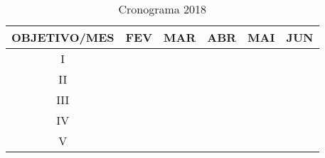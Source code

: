 \documentclass[
	12pt,				%
	openright,			%
	oneside,			%
	a4paper,			%
	english,			%
	french,				%
	spanish,			%
	brazil,				%
	]{abntex2}
\begin{document}
	\begin{table}[h!]
	\centering
	\caption{Cronograma 2018}
	\label{my-label}
	\begin{tabular}{|c|c|c|c|c|c|}
		\hline
		OBJETIVO/MES & FEV & MAR & ABR & MAI & JUN \\ \hline
		I &  & & & & \\ \hline
		II &  & & & & \\ \hline
		III &  & & & & \\ \hline
		IV &  & & & & \\ \hline
		V &  & & & & \\ \hline
	\end{tabular}
\end{table}


\end{document}
